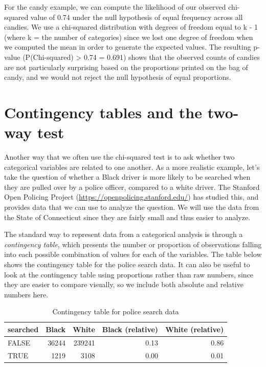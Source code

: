 \documentclass[12pt,]{book}
\theoremstyle{definition}
\theoremstyle{definition}
\theoremstyle{definition}
\theoremstyle{remark}
\begin{document}
For the candy example, we can compute the likelihood of our observed chi-squared value of 0.74 under the null hypothesis of equal frequency across all candies. We use a chi-squared distribution with degrees of freedom equal to k - 1 (where k = the number of categories) since we lost one degree of freedom when we computed the mean in order to generate the expected values. The resulting p-value (P(Chi-squared) \textgreater{} 0.74 = 0.691) shows that the observed counts of candies are not particularly surprising based on the proportions printed on the bag of candy, and we would not reject the null hypothesis of equal proportions.

\hypertarget{two-way-test}{%
\section{Contingency tables and the two-way test}\label{two-way-test}}

Another way that we often use the chi-squared test is to ask whether two categorical variables are related to one another. As a more realistic example, let's take the question of whether a Black driver is more likely to be searched when they are pulled over by a police officer, compared to a white driver. The Stanford Open Policing Project (\url{https://openpolicing.stanford.edu/}) has studied this, and provides data that we can use to analyze the question. We will use the data from the State of Connecticut since they are fairly small and thus easier to analyze.

The standard way to represent data from a categorical analysis is through a \emph{contingency table}, which presents the number or proportion of observations falling into each possible combination of values for each of the variables. The table below shows the contingency table for the police search data. It can also be useful to look at the contingency table using proportions rather than raw numbers, since they are easier to compare visually, so we include both absolute and relative numbers here.

\begin{table}

\caption{\label{tab:unnamed-chunk-82}Contingency table for police search data}
\centering
\begin{tabular}[t]{l|r|r|r|r}
\hline
searched & Black & White & Black (relative) & White (relative)\\
\hline
FALSE & 36244 & 239241 & 0.13 & 0.86\\
\hline
TRUE & 1219 & 3108 & 0.00 & 0.01\\
\hline
\end{tabular}
\end{table}
\end{document}
